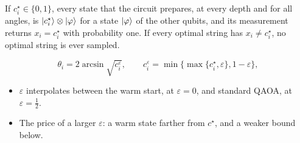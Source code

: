\documentclass[handoutsbeamer.tex]{subfiles}
\begin{document}
\begin{frame}
\onp{\footnotesize}
\begin{lem}\label{lem:ch11:frozen}
If $c_i^\star\in\{0,1\}$, every state that the circuit prepares, at every depth and for all angles, is $\ket{c_i^\star}\otimes\ket\varphi$ for a state $\ket\varphi$ of the other qubits, and its measurement returns $x_i = c_i^\star$ with probability one. If every optimal string has $x_i\ne c_i^\star$, no optimal string is ever sampled.
\end{lem}
\begin{equation}\label{eq:ch11:eps}
    \theta_i = 2\arcsin\sqrt{c_i^\varepsilon},\qquad c_i^\varepsilon = \min\{\max\{c_i^\star,\varepsilon\},1-\varepsilon\},
\end{equation}
\begin{itemize}\setlength\itemsep{0.2em}
    \item $\varepsilon$ interpolates between the warm start, at $\varepsilon = 0$, and standard QAOA, at $\varepsilon = \frac12$.
    \item The price of a larger $\varepsilon$: a warm state farther from $c^\star$, and a weaker bound below.
\end{itemize}
\end{frame}
\end{document}
